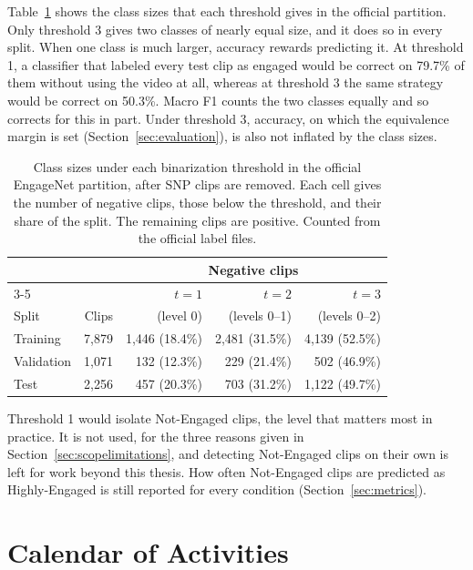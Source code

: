 Table~\ref{tab:thresholds} shows the class sizes that each threshold gives in the official partition. Only threshold 3 gives two classes of nearly equal size, and it does so in every split. When one class is much larger, accuracy rewards predicting it. At threshold 1, a classifier that labeled every test clip as engaged would be correct on 79.7\% of them without using the video at all, whereas at threshold 3 the same strategy would be correct on 50.3\%. Macro F1 counts the two classes equally and so corrects for this in part. Under threshold 3, accuracy, on which the equivalence margin is set (Section~\ref{sec:evaluation}), is also not inflated by the class sizes.

\begin{table}[t]
   \centering
   \caption[Class sizes under each binarization threshold]{Class sizes under each binarization threshold in the official EngageNet partition, after SNP clips are removed. Each cell gives the number of negative clips, those below the threshold, and their share of the split. The remaining clips are positive. Counted from the official label files.}
   \label{tab:thresholds}
   \begin{tabular}{lrrrr}
      \toprule
      & & \multicolumn{3}{c}{Negative clips} \\
      \cmidrule(lr){3-5}
      & & $t = 1$ & $t = 2$ & $t = 3$ \\
      Split & Clips & (level 0) & (levels 0--1) & (levels 0--2) \\
      \midrule
      Training & 7,879 & 1,446 (18.4\%) & 2,481 (31.5\%) & 4,139 (52.5\%) \\
      Validation & 1,071 & 132 (12.3\%) & 229 (21.4\%) & 502 (46.9\%) \\
      Test & 2,256 & 457 (20.3\%) & 703 (31.2\%) & 1,122 (49.7\%) \\
      \bottomrule
   \end{tabular}
\end{table}

Threshold 1 would isolate Not-Engaged clips, the level that matters most in practice. It is not used, for the three reasons given in Section~\ref{sec:scopelimitations}, and detecting Not-Engaged clips on their own is left for work beyond this thesis. How often Not-Engaged clips are predicted as Highly-Engaged is still reported for every condition (Section~\ref{sec:metrics}).



\section{Calendar of Activities}
\label{sec:calendar}

